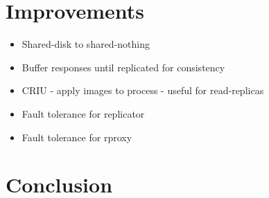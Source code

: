 \documentclass[draft]{proc}
\newcommand{\bit}{\begin{itemize}}
\newcommand{\eit}{\end{itemize}}
\begin{document}
\section{Improvements}

\bit
  \item Shared-disk to shared-nothing
  \item Buffer responses until replicated for consistency
  \item CRIU - apply images to process - useful for read-replicas
  \item Fault tolerance for replicator
  \item Fault tolerance for rproxy
\eit

\section{Conclusion}

\printbibliography
\end{document}
